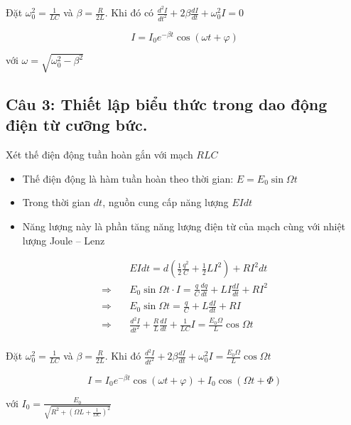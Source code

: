 Đặt $\omega_0^2 = \frac{1}{LC}$ và $\beta = \frac{R}{2L}$. Khi đó có $\frac{d^2I}{dt^2} + 2\beta\frac{dI}{dt} + \omega_0^2 I = 0$

\begin{equation*}
  I = I_0 e^{-\beta t} \cos\left( \omega t + \varphi \right)
\end{equation*}

với $\omega = \sqrt{\omega_0^2 - \beta^2}$

\subsection[Câu 3]{Câu 3: Thiết lập biểu thức trong dao động điện từ cưỡng bức.}

Xét thế điện động tuần hoàn gắn với mạch $RLC$

\begin{itemize}
  \item Thế điện động là hàm tuần hoàn theo thời gian: $E = E_0 \sin \Omega t$
  \item Trong thời gian $dt$, nguồn cung cấp năng lượng $EIdt$
  \item Năng lượng này là phần tăng năng lượng điện từ của mạch cùng với nhiệt lượng Joule -- Lenz
\end{itemize}

\begin{align*}
  {}\quad & EIdt = d\left( \frac{1}{2}\frac{q^2}{C} + \frac{1}{2} LI^2 \right) + RI^2dt \\
  \Rightarrow\quad & E_0\sin\Omega t \cdot I = \frac{q}{C} \frac{dq}{dt} + LI\frac{dI}{dt} + RI^2 \\
  \Rightarrow\quad & E_0\sin\Omega t = \frac{q}{C} + L\frac{dI}{dt} + RI \\
  \Rightarrow\quad & \frac{d^2I}{dt^2} + \frac{R}{L} \frac{dI}{dt} + \frac{1}{LC} I = \frac{E_0 \Omega}{L} \cos \Omega t \\
\end{align*}

Đặt $\omega_0^2 = \frac{1}{LC}$ và $\beta = \frac{R}{2L}$. Khi đó $\frac{d^2I}{dt^2} + 2\beta\frac{dI}{dt} + \omega_0^2 I = \frac{E_0 \Omega}{L} \cos \Omega t$

\begin{equation*}
  I = I_0 e^{-\beta t} \cos (\omega t + \varphi) + I_0 \cos \left( \Omega t + \Phi \right)
\end{equation*}

với $I_0 = \frac{E_0}{\sqrt{R^2 + \left( \Omega L + \frac{1}{\Omega C} \right)^2}}$